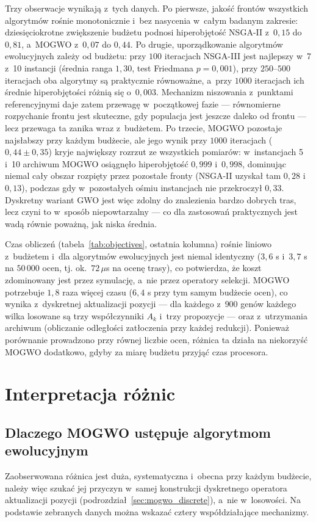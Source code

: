 Trzy obserwacje wynikają z~tych danych. Po pierwsze, jakość frontów wszystkich
algorytmów rośnie monotonicznie i~bez nasycenia w~całym badanym zakresie:
dziesięciokrotne zwiększenie budżetu podnosi hiperobjętość NSGA-II z~$0{,}15$ do
$0{,}81$, a~MOGWO z~$0{,}07$ do $0{,}44$. Po drugie, uporządkowanie algorytmów
ewolucyjnych zależy od budżetu: przy $100$ iteracjach NSGA-III jest najlepszy
w~7 z~10 instancji (średnia ranga $1{,}30$, test Friedmana $p = 0{,}001$), przy
$250$--$500$ iteracjach oba algorytmy są praktycznie równoważne, a~przy $1000$
iteracjach ich średnie hiperobjętości różnią się o~$0{,}003$. Mechanizm niszowania
z~punktami referencyjnymi daje zatem przewagę w~początkowej fazie --- równomierne
rozpychanie frontu jest skuteczne, gdy populacja jest jeszcze daleko od frontu ---
lecz przewaga ta zanika wraz z~budżetem. Po trzecie, MOGWO pozostaje najsłabszy
przy każdym budżecie, ale jego wynik przy $1000$ iteracjach ($0{,}44 \pm 0{,}35$)
kryje największy rozrzut ze wszystkich pomiarów: w~instancjach 5 i~10 archiwum
MOGWO osiągnęło hiperobjętość $0{,}999$ i~$0{,}998$, dominując niemal cały obszar
rozpięty przez pozostałe fronty (NSGA-II uzyskał tam $0{,}28$ i~$0{,}13$), podczas
gdy w~pozostałych ośmiu instancjach nie przekroczył $0{,}33$. Dyskretny wariant
GWO jest więc zdolny do znalezienia bardzo dobrych tras, lecz czyni to w~sposób
niepowtarzalny --- co dla zastosowań praktycznych jest wadą równie poważną, jak
niska średnia.

Czas obliczeń (tabela~\ref{tab:objectives}, ostatnia kolumna) rośnie liniowo
z~budżetem i~dla algorytmów ewolucyjnych jest niemal identyczny ($3{,}6$ s
i~$3{,}7$ s na $50\,000$ ocen, tj. ok.~$72\,\mu$s na ocenę trasy), co potwierdza,
że koszt zdominowany jest przez symulację, a~nie przez operatory selekcji. MOGWO
potrzebuje $1{,}8$ raza więcej czasu ($6{,}4$ s przy tym samym budżecie ocen), co
wynika z~dyskretnej aktualizacji pozycji --- dla każdego z~$900$ genów każdego
wilka losowane są trzy współczynniki $A_k$ i~trzy propozycje --- oraz z~utrzymania
archiwum (obliczanie odległości zatłoczenia przy każdej redukcji). Ponieważ
porównanie prowadzono przy równej liczbie ocen, różnica ta działa na niekorzyść
MOGWO dodatkowo, gdyby za miarę budżetu przyjąć czas procesora.

\section{Interpretacja różnic}
\label{sec:analiza_interpretacja}

\subsection{Dlaczego MOGWO ustępuje algorytmom ewolucyjnym}
\label{sec:analiza_mogwo}
Zaobserwowana różnica jest duża, systematyczna i~obecna przy każdym budżecie,
należy więc szukać jej przyczyn w~samej konstrukcji dyskretnego operatora
aktualizacji pozycji (podrozdział~\ref{sec:mogwo_discrete}), a~nie w~losowości.
Na podstawie zebranych danych można wskazać cztery współdziałające mechanizmy.

